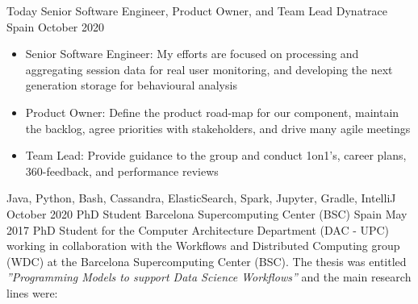 %
%
%


\begin{experiences}
    \experience
        {Today}
        {Senior Software Engineer, Product Owner, and Team Lead}
        {Dynatrace}
        {Spain}
        {October 2020}
        {
        \begin{itemize}
            \item Senior Software Engineer: My efforts are focused on processing and aggregating session data for real user monitoring, and developing the next generation storage for behavioural analysis
            \item Product Owner: Define the product road-map for our component, maintain the backlog, agree priorities with stakeholders, and drive many agile meetings
            \item Team Lead: Provide guidance to the group and conduct 1on1's, career plans, 360-feedback, and performance reviews
        \end{itemize}
        }
        {Java, Python, Bash, Cassandra, ElasticSearch, Spark, Jupyter, Gradle, IntelliJ}
    \emptySeparator
    \experience
        {October 2020}
        {PhD Student}
        {Barcelona Supercomputing Center (BSC)}
        {Spain}
        {May 2017}
        {PhD Student for the Computer Architecture Department (DAC - UPC) working in collaboration with the Workflows and Distributed Computing group (WDC) at the Barcelona Supercomputing Center (BSC). The thesis was entitled \textit{''Programming Models to support Data Science Workflows''} and the main research lines were:
}
\end{experiences}

